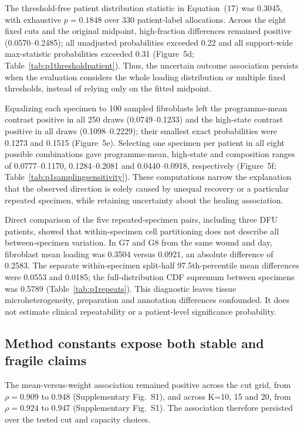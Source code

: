\documentclass[10pt,a4paper]{article}
\begin{document}
The threshold-free patient distribution statistic in Equation~(17) was 0.3045, with exhaustive $p=0.1848$ over 330 patient-label allocations. Across the eight fixed cuts and the original midpoint, high-fraction differences remained positive (0.0570--0.2485); all unadjusted probabilities exceeded 0.22 and all support-wide max-statistic probabilities exceeded 0.31 (Figure~5d; Table~\ref{tab:p1thresholdpatient}). Thus, the uncertain outcome association persists when the evaluation considers the whole loading distribution or multiple fixed thresholds, instead of relying only on the fitted midpoint.

Equalizing each specimen to 100 sampled fibroblasts left the programme-mean contrast positive in all 250 draws (0.0749--0.1233) and the high-state contrast positive in all draws (0.1098--0.2229); their smallest exact probabilities were 0.1273 and 0.1515 (Figure~5e). Selecting one specimen per patient in all eight possible combinations gave programme-mean, high-state and composition ranges of 0.0777--0.1170, 0.1284--0.2081 and 0.0440--0.0918, respectively (Figure~5f; Table~\ref{tab:p1samplingsensitivity}). These computations narrow the explanation that the observed direction is solely caused by unequal recovery or a particular repeated specimen, while retaining uncertainty about the healing association.


Direct comparison of the five repeated-specimen pairs, including three DFU patients, showed that within-specimen cell partitioning does not describe all between-specimen variation. In G7 and G8 from the same wound and day, fibroblast mean loading was 0.3504 versus 0.0921, an absolute difference of 0.2583. The separate within-specimen split-half 97.5th-percentile mean differences were 0.0553 and 0.0185; the full-distribution CDF supremum between specimens was 0.5789 (Table~\ref{tab:p1repeats}). This diagnostic leaves tissue microheterogeneity, preparation and annotation differences confounded. It does not estimate clinical repeatability or a patient-level significance probability.

\subsection{Method constants expose both stable and fragile claims}



The mean-versus-weight association remained positive across the cut grid, from $\rho=0.909$ to 0.948 (Supplementary Fig.~S1\label{call:p1f6}), and across K=10, 15 and 20, from $\rho=0.924$ to 0.947 (Supplementary Fig.~S1). The association therefore persisted over the tested cut and capacity choices.
\end{document}
